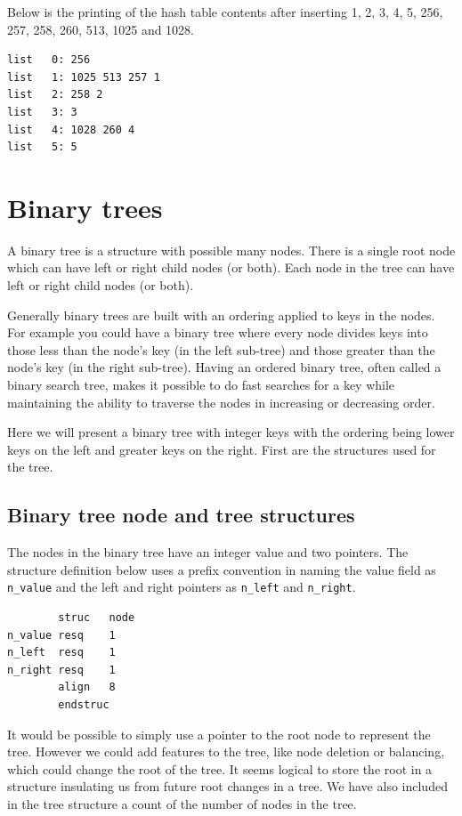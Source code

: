 \documentclass[11pt,b5paper]{book}
\begin{document}
Below is the printing of the hash table contents after
inserting 1, 2, 3, 4, 5, 256, 257, 258, 260, 513, 1025 and 1028.

\begin{verbatim}
list   0: 256 
list   1: 1025 513 257 1 
list   2: 258 2 
list   3: 3 
list   4: 1028 260 4 
list   5: 5 
\end{verbatim}


\section{Binary trees}

A binary tree is a structure with possible many nodes.
There is a single root node which can have left or right child nodes (or both).
Each node in the tree can have left or right child nodes (or both).

Generally binary trees are built with an ordering applied to keys in the nodes.
For example you could have a binary tree where every node divides keys into those less than the node's key
(in the left sub-tree) and those greater than the node's key (in the right sub-tree).
Having an ordered binary tree, often called a binary search tree, makes it possible to do fast searches
for a key while maintaining the ability to traverse the nodes in increasing or decreasing order.

Here we will present a binary tree with integer keys with the ordering being lower keys on the left and
greater keys on the right.
First are the structures used for the tree.

\subsection{Binary tree node and tree structures}

The nodes in the binary tree have an integer value and two pointers.
The structure definition below uses a prefix convention in naming the value field as {\tt n\_value} and
the left and right pointers as {\tt n\_left} and {\tt n\_right}.

\begin{verbatim}
        struc   node
n_value resq    1
n_left  resq    1
n_right resq    1
        align   8
        endstruc
\end{verbatim}

It would be possible to simply use a pointer to the root node to represent the tree.
However we could add features to the tree, like node deletion or balancing, which could change the root of
the tree.
It seems logical to store the root in a structure insulating us from future root changes in a tree.
We have also included in the tree structure a count of the number of nodes in the tree.
\end{document}
